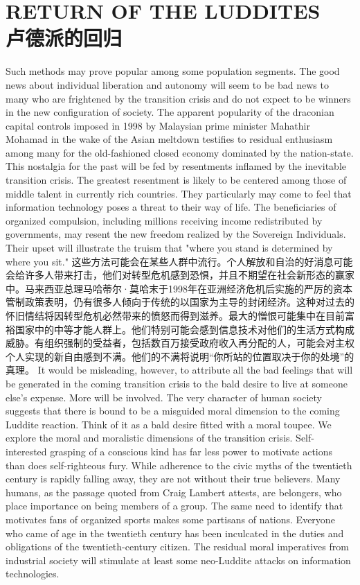 \section[卢德派回归]{RETURN OF THE LUDDITES\\卢德派的回归}
\begin{paracol}{2}[]
Such methods may prove popular among some population segments. The good news about individual liberation and autonomy will seem to be bad news to many who are frightened by the transition crisis and do not expect to be winners in the new configuration of society. The apparent popularity of the draconian capital controls imposed in 1998 by Malaysian prime minister Mahathir Mohamad in the wake of the Asian meltdown testifies to residual enthusiasm among many for the old-fashioned closed economy dominated by the nation-state. This nostalgia for the past will be fed by resentments inflamed by the inevitable transition crisis. The greatest resentment is likely to be centered among those of middle talent in currently rich countries. They particularly may come to feel that information technology poses a threat to their way of life. The beneficiaries of organized compulsion, including millions receiving income redistributed by governments, may resent the new freedom realized by the Sovereign Individuals. Their upset will illustrate the truism that "where you stand is determined by where you sit."
\switchcolumn
这些方法可能会在某些人群中流行。个人解放和自治的好消息可能会给许多人带来打击，他们对转型危机感到恐惧，并且不期望在社会新形态的赢家中。马来西亚总理马哈蒂尔·莫哈末于1998年在亚洲经济危机后实施的严厉的资本管制政策表明，仍有很多人倾向于传统的以国家为主导的封闭经济。这种对过去的怀旧情结将因转型危机必然带来的愤怒而得到滋养。最大的憎恨可能集中在目前富裕国家中的中等才能人群上。他们特别可能会感到信息技术对他们的生活方式构成威胁。有组织强制的受益者，包括数百万接受政府收入再分配的人，可能会对主权个人实现的新自由感到不满。他们的不满将说明“你所站的位置取决于你的处境”的真理。
\switchcolumn*
It would be misleading, however, to attribute all the bad feelings that will be generated in the coming transition crisis to the bald desire to live at someone else's expense. More will be involved. The very character of human society suggests that there is bound to be a misguided moral dimension to the coming Luddite reaction. Think of it as a bald desire fitted with a moral toupee. We explore the moral and moralistic dimensions of the transition crisis. Self-interested grasping of a conscious kind has far less power to motivate actions than does self-righteous fury. While adherence to the civic myths of the twentieth century is rapidly falling away, they are not without their true believers. Many humans, as the passage quoted from Craig Lambert attests, are belongers, who place importance on being members of a group. The same need to identify that motivates fans of organized sports makes some partisans of nations. Everyone who came of age in the twentieth century has been inculcated in the duties and obligations of the twentieth-century citizen. The residual moral imperatives from industrial society will stimulate at least some neo-Luddite attacks on information technologies.


\end{paracol}
